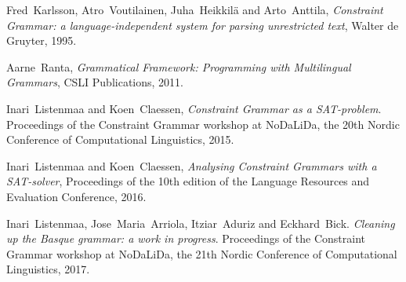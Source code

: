 \documentclass[conference]{IEEEtran}
\begin{document}


%
%
%
\begin{thebibliography}{1}


  Fred~Karlsson,  Atro~Voutilainen, Juha~Heikkil{\"{a}} and Arto~Anttila,
 \emph{Constraint Grammar: a language-independent system for parsing unrestricted text},
Walter de Gruyter, 1995.

  Aarne~Ranta, \emph{Grammatical Framework: Programming with Multilingual Grammars}, 
     CSLI Publications, 2011.

 Inari~Listenmaa and Koen~Claessen, \emph{Constraint Grammar as a SAT-problem}. Proceedings of the Constraint Grammar workshop at NoDaLiDa, the 20th Nordic Conference of Computational Linguistics, 2015.

  Inari~Listenmaa and Koen~Claessen, \emph{Analysing Constraint Grammars with a SAT-solver},
  Proceedings of the 10th edition of the Language Resources and Evaluation Conference, 2016.

  Inari~Listenmaa, Jose~Maria~Arriola, Itziar~Aduriz and Eckhard~Bick. \emph{Cleaning up the Basque grammar: a work in progress}. 
  Proceedings of the Constraint Grammar workshop at NoDaLiDa, the 21th Nordic Conference of Computational Linguistics, 2017.


\end{thebibliography}




\end{document}
